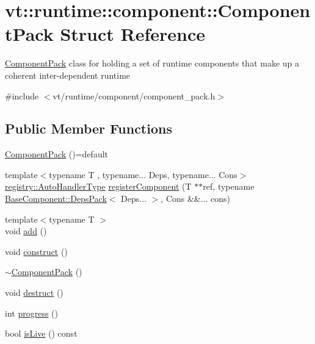 \hypertarget{structvt_1_1runtime_1_1component_1_1_component_pack}{}\section{vt\+:\+:runtime\+:\+:component\+:\+:Component\+Pack Struct Reference}
\label{structvt_1_1runtime_1_1component_1_1_component_pack}


{\ttfamily \hyperlink{structvt_1_1runtime_1_1component_1_1_component_pack}{Component\+Pack}} class for holding a set of runtime components that make up a coherent inter-\/dependent runtime  




{\ttfamily \#include $<$vt/runtime/component/component\+\_\+pack.\+h$>$}

\subsection*{Public Member Functions}
\begin{DoxyCompactItemize}
\item 
\hyperlink{structvt_1_1runtime_1_1component_1_1_component_pack_a113f2da49d2033f09831b6807c92d330}{Component\+Pack} ()=default
\item 
{\footnotesize template$<$typename T , typename... Deps, typename... Cons$>$ }\\\hyperlink{namespacevt_1_1runtime_1_1component_1_1registry_a9b86518797c7bb91babf0ca8ee7d06e6}{registry\+::\+Auto\+Handler\+Type} \hyperlink{structvt_1_1runtime_1_1component_1_1_component_pack_a956437fba91b2b90576df33276858df5}{register\+Component} (T $\ast$$\ast$ref, typename \hyperlink{structvt_1_1runtime_1_1component_1_1_base_component_1_1_deps_pack}{Base\+Component\+::\+Deps\+Pack}$<$ Deps... $>$, Cons \&\&... cons)
\item 
{\footnotesize template$<$typename T $>$ }\\void \hyperlink{structvt_1_1runtime_1_1component_1_1_component_pack_a2be733d29f56456f71352569a898dee5}{add} ()
\item 
void \hyperlink{structvt_1_1runtime_1_1component_1_1_component_pack_ab5f7966f4de3f81643d9945302de7cfa}{construct} ()
\item 
\hyperlink{structvt_1_1runtime_1_1component_1_1_component_pack_ad850ada38f5f4397fa414885a545fdaf}{$\sim$\+Component\+Pack} ()
\item 
void \hyperlink{structvt_1_1runtime_1_1component_1_1_component_pack_a1821ae6fbe03896a3a4a61bf44a5d38b}{destruct} ()
\item 
int \hyperlink{structvt_1_1runtime_1_1component_1_1_component_pack_a38f85e6b4417904ea404c03fc167f5a7}{progress} ()
\item 
bool \hyperlink{structvt_1_1runtime_1_1component_1_1_component_pack_a67db159a0ceb87496df4dd40ce9d44b4}{is\+Live} () const
\end{DoxyCompactItemize}
